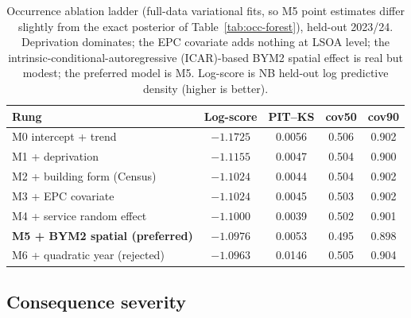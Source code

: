 \begin{table}[htbp]
  \centering
  \caption{Occurrence ablation ladder (full-data variational fits, so M5 point
  estimates differ slightly from the exact posterior of
  Table~\ref{tab:occ-forest}), held-out
  2023/24. Deprivation dominates; the EPC covariate adds nothing at LSOA level; the
  intrinsic-conditional-autoregressive (ICAR)-based BYM2 spatial effect is real but
  modest; the preferred model is M5. Log-score is NB held-out log predictive density
  (higher is better).}
  \label{tab:ablation}
  \small
  \begin{tabular}{@{}lcccc@{}}
    \toprule
    Rung & Log-score & PIT--KS & cov50 & cov90 \\
    \midrule
    M0 intercept + trend        & $-1.1725$ & 0.0056 & 0.506 & 0.902 \\
    M1 + deprivation            & $-1.1155$ & 0.0047 & 0.504 & 0.900 \\
    M2 + building form (Census) & $-1.1024$ & 0.0044 & 0.504 & 0.902 \\
    M3 + EPC covariate          & $-1.1024$ & 0.0045 & 0.503 & 0.902 \\
    M4 + service random effect  & $-1.1000$ & 0.0039 & 0.502 & 0.901 \\
    \textbf{M5 + BYM2 spatial (preferred)} & $-1.0976$ & 0.0053 & 0.495 & 0.898 \\
    M6 + quadratic year (rejected) & $-1.0963$ & 0.0146 & 0.505 & 0.904 \\
    \bottomrule
  \end{tabular}
\end{table}

\subsection{Consequence severity}
\label{sec:results-casualty}

